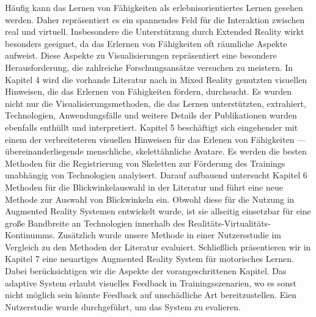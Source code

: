 Häufig kann das Lernen von Fähigkeiten als erlebnisorientiertes Lernen gesehen werden. Daher repräsentiert es ein spannendes Feld für die Interaktion zwischen real und virtuell. Insbesondere die Unterstützung durch Extended Reality wirkt besonders geeignet, da das Erlernen von Fähigkeiten oft räumliche Aspekte aufweist. Diese Aspekte zu Visualisierungen repräsentiert eine besondere Herausforderung, die zahlreiche Forschungsansätze versuchen zu meistern. In Kapitel 4 wird die vorhande Literatur nach in Mixed Reality genutzten visuellen Hinweisen, die das Erlernen von Fähigkeiten fördern, durchsucht. Es wurden nicht nur die Visualisierungsmethoden, die das Lernen unterstützten, extrahiert, Technologien, Anwendungsfälle und weitere Details der Publikationen wurden ebenfalls enthüllt und interpretiert. Kapitel 5 beschäftigt sich eingehender mit einem der verbreiteteren visuellen Hinweisen für das Erlenen von Fähigkeiten --- übereinanderliegende menschliche, skelettähnliche Avatare. Es werden die besten Methoden für die Registrierung von Skeletten zur Förderung des Trainings unabhängig von Technologien analyisert. Darauf aufbauend untersucht Kapitel 6 Methoden für die Blickwinkelauswahl in der Literatur und führt eine neue Methode zur Auswahl von Blickwinkeln ein. Obwohl diese für die Nutzung in Augmented Reality Systemen entwickelt wurde, ist sie allseitig einsetzbar für eine große Bandbreite an Technologien innerhalb des Realitäts-Virtualitäts-Kontinumms. Zusätzlich wurde unsere Methode in einer Nutzersstudie im Vergleich zu den Methoden der Literatur evaluiert. Schließlich präsentieren wir in Kapitel 7 eine neuartiges Augmented Reality System für motorisches Lernen. Dabei berücksichtigen wir die Aspekte der vorangeschrittenen Kapitel. Das adaptive System erlaubt visuelles Feedback in Trainingsszenarien, wo es sonst nicht möglich sein könnte Feedback auf unschädliche Art bereitzustellen. Eien Nutzerstudie wurde durchgeführt, um das System zu evalieren.
